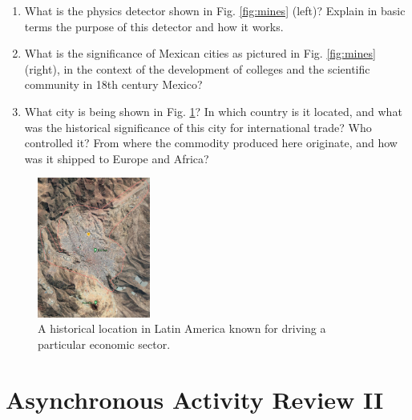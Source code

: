 \documentclass[10pt]{article}
\begin{document}
\begin{enumerate}
\item What is the physics detector shown in Fig. \ref{fig:mines} (left)?  Explain in basic terms the purpose of this detector and how it works. \\ \vspace{2cm}
\item What is the significance of Mexican cities as pictured in Fig. \ref{fig:mines} (right), in the context of the development of colleges and the scientific community in 18th century Mexico? \\ \vspace{2cm}
\item What city is being shown in Fig. \ref{fig:mines2}?  In which country is it located, and what was the historical significance of this city for international trade?  Who controlled it?  From where the commodity produced here originate, and how was it shipped to Europe and Africa?
\end{enumerate}

\begin{figure}
\centering
\includegraphics[width=0.33\textwidth]{figures/cerro.png}
\caption{\label{fig:mines2} A historical location in Latin America known for driving a particular economic sector.}
\end{figure}

\clearpage

\section{Asynchronous Activity Review II}
\end{document}
